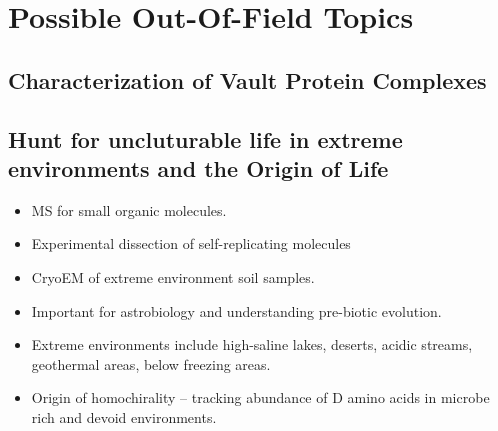 


 
\section*{Possible Out-Of-Field Topics} 
\subsection*{Characterization of Vault Protein Complexes}
\subsection*{Hunt for uncluturable life in extreme environments and the Origin
of Life} 
	\begin{itemize} 
		\item MS for small organic molecules.
		\item Experimental dissection of self-replicating molecules	
		\item CryoEM of extreme environment soil samples.  
		\item Important for astrobiology and understanding pre-biotic evolution.  
		\item Extreme environments include high-saline lakes, deserts, acidic streams, geothermal areas, below freezing areas.
		\item Origin of homochirality -- tracking abundance of D amino
			acids in microbe rich and devoid environments.
	\end{itemize} 


